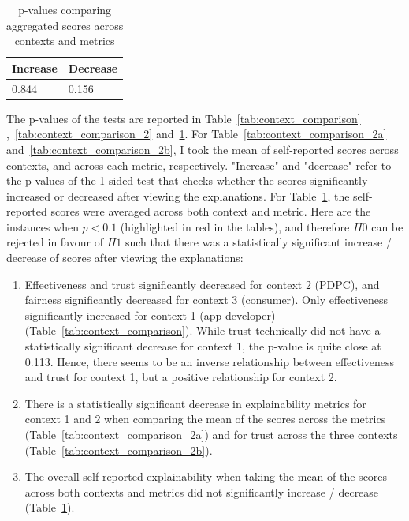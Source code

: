 \begin{table}[!ht]
    \centering
    \begin{tabular}{|l|l|}
        \hline
        \textbf{Increase} & \textbf{Decrease} \\ \hline
        0.844             & 0.156           \\ \hline
    \end{tabular}
    \caption{p-values comparing aggregated scores across contexts and metrics}
    \label{tab:context_comparison_3}
\end{table}

The p-values of the tests are reported in Table~\ref{tab:context_comparison} ,~\ref{tab:context_comparison_2} and~\ref{tab:context_comparison_3}. For Table~\ref{tab:context_comparison_2a} and~\ref{tab:context_comparison_2b}, I took the mean of self-reported scores across contexts, and across each metric, respectively. "Increase" and "decrease" refer to the p-values of the 1-sided test that checks whether the scores significantly increased or decreased after viewing the explanations. For Table~\ref{tab:context_comparison_3}, the self-reported scores were averaged across both context and metric.  Here are the instances when $p<0.1$ (highlighted in red in the tables), and therefore $H0$ can be rejected in favour of $H1$ such that there was a statistically significant increase / decrease of scores after viewing the explanations:
\begin{enumerate}
    \item Effectiveness and trust significantly decreased for context 2 (PDPC), and fairness significantly decreased for context 3 (consumer). Only effectiveness significantly increased for context 1 (app developer) (Table~\ref{tab:context_comparison}). While trust technically did not have a statistically significant decrease for context 1, the p-value is quite close at 0.113. Hence, there seems to be an inverse relationship between effectiveness and trust for context 1, but a positive relationship for context 2.
    \item There is a statistically significant decrease in explainability metrics for context 1 and 2 when comparing the mean of the scores across the metrics (Table~\ref{tab:context_comparison_2a}) and for trust across the three contexts (Table~\ref{tab:context_comparison_2b}).
    \item The overall self-reported explainability when taking the mean of the scores across both contexts and metrics did not significantly increase / decrease (Table~\ref{tab:context_comparison_3}).
\end{enumerate}

